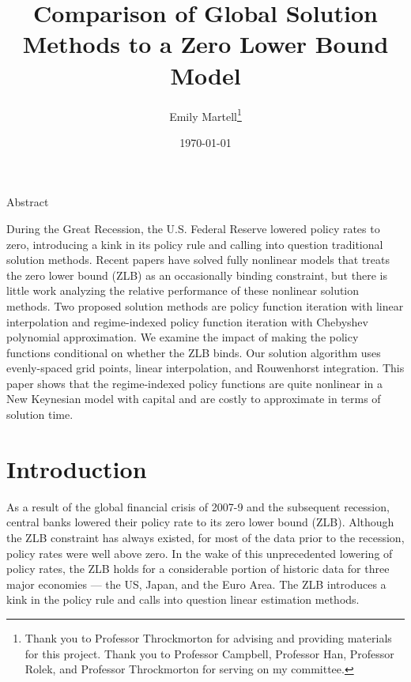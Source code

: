 \documentclass[12pt, final]{article}
\title{Comparison of Global Solution Methods to a Zero Lower Bound Model}
\date{\small\today}
\author{Emily Martell\thanks{Thank you to Professor Throckmorton for advising and providing materials for this project. Thank you to Professor Campbell, Professor Han, Professor Rolek, and Professor Throckmorton for serving on my committee.}}
\newcommand{\forceindent}{\leavevmode{\parindent=15pt\indent}}
\begin{document}
\maketitle
\bigskip
\begin{center}
\fontsize{14pt}{\baselineskip}\sc Abstract%
\end{center}

\onehalfspacing
\begin{changemargin}{1cm}{1cm}

{\small \forceindent During the Great Recession, the U.S. Federal Reserve lowered policy rates to zero, introducing a kink in its policy rule and calling into question traditional solution methods. Recent papers have solved fully nonlinear models that treats the zero lower bound (ZLB) as an occasionally binding constraint, but there is little work analyzing the relative performance of these nonlinear solution methods. Two proposed solution methods are policy function iteration with linear interpolation and regime-indexed policy function iteration with Chebyshev polynomial approximation. We examine the impact of making the policy functions conditional on whether the ZLB binds. Our solution algorithm uses evenly-spaced grid points, linear interpolation, and Rouwenhorst integration. This paper shows that the regime-indexed policy functions are quite nonlinear in a New Keynesian model with capital and are costly to approximate in terms of solution time.}


\end{changemargin}
\vfill
\pagebreak

\section{Introduction}

As a result of the global financial crisis of 2007-9 and the subsequent recession, central banks lowered
their policy rate to its zero lower bound (ZLB). Although the ZLB constraint has always existed,
for most of the data prior to the recession, policy rates were well above zero. In the wake of this
unprecedented lowering of policy rates, the ZLB holds for a considerable portion of historic data
for three major economies --- the US, Japan, and the Euro Area. The ZLB introduces a kink in the policy
rule and calls into question linear estimation methods. 
\end{document}
